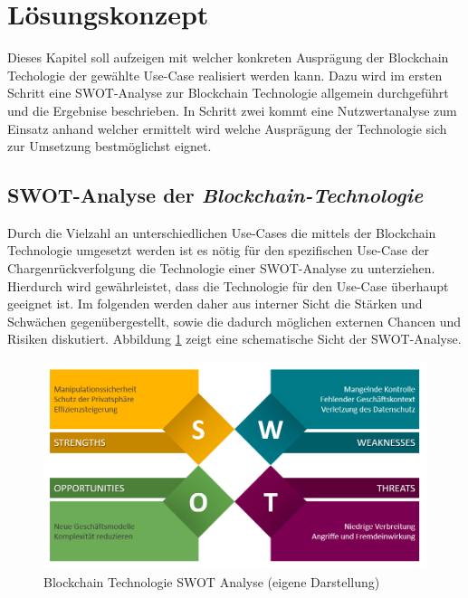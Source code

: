 \section{Lösungskonzept} \label{sec:solution-concept}
Dieses Kapitel soll aufzeigen mit welcher konkreten Ausprägung der Blockchain Techologie der gewählte Use-Case realisiert werden kann. Dazu wird im ersten Schritt eine SWOT-Analyse zur Blockchain Technologie allgemein durchgeführt und die Ergebnise beschrieben. In Schritt zwei kommt eine Nutzwertanalyse zum Einsatz anhand welcher ermittelt wird welche Ausprägung der Technologie sich zur Umsetzung bestmöglichst eignet.

\subsection{SWOT-Analyse der \textit{Blockchain-Technologie}} \label{swot-analyse}
Durch die Vielzahl an unterschiedlichen Use-Cases die mittels der Blockchain Technologie umgesetzt werden ist es nötig für den spezifischen Use-Case der Chargenrückverfolgung die Technologie einer SWOT-Analyse zu unterziehen. Hierdurch wird gewährleistet, dass die Technologie für den Use-Case überhaupt geeignet ist. Im folgenden werden daher aus interner Sicht die Stärken und Schwächen gegenübergestellt, sowie die dadurch möglichen externen Chancen und Risiken diskutiert. Abbildung \ref{fig:blockchain-technology-swot-analysis} zeigt eine schematische Sicht der SWOT-Analyse.

\begin{figure}[H]
	\centering
	\includegraphics[width=1\linewidth]{pictures/blockchain-technology-swot-analysis}
	\caption[Blockchain Technologie SWOT Analyse]{Blockchain Technologie SWOT Analyse (eigene Darstellung)}
	\label{fig:blockchain-technology-swot-analysis}
\end{figure}

